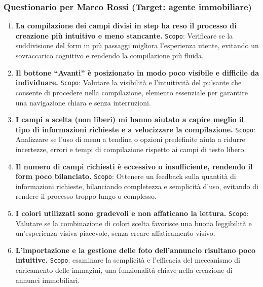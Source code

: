 \subsubsection*{Questionario per Marco Rossi (Target: agente immobiliare)}
\vspace{0.5cm} %
\begin{enumerate}
	\item \textbf{La compilazione dei campi divisi in step ha reso il processo di creazione più intuitivo e meno stancante.}
	\newline
	\texttt{Scopo}: Verificare se la suddivisione del form in più passaggi migliora l’esperienza utente, evitando un sovraccarico cognitivo e rendendo la compilazione più fluida.
	
	\item \textbf{Il bottone “Avanti” è posizionato in modo poco visibile e difficile da individuare.}
	\newline
	\texttt{Scopo}: Valutare la visibilità e l’intuitività del pulsante che consente di procedere nella compilazione, elemento essenziale per garantire una navigazione chiara e senza interruzioni.
	
	\item \textbf{I campi a scelta (non liberi) mi hanno aiutato a capire meglio il tipo di informazioni richieste e a velocizzare la compilazione.}
	\newline
	\texttt{Scopo}: Analizzare se l’uso di menu a tendina o opzioni predefinite aiuta a ridurre incertezze, errori e tempi di compilazione rispetto ai campi di testo libero.
	
	
	\item \textbf{Il numero di campi richiesti è eccessivo o insufficiente, rendendo il form poco bilanciato.}
	\newline
	\texttt{Scopo}: Ottenere un feedback sulla quantità di informazioni richieste, bilanciando completezza e semplicità d’uso, evitando di rendere il processo troppo lungo o complesso.
	
	\item \textbf{I colori utilizzati sono gradevoli e non affaticano la lettura.}
	\newline
	\texttt{Scopo}: Valutare se la combinazione di colori scelta favorisce una buona leggibilità e un’esperienza visiva piacevole, senza creare affaticamento visivo.
	
	\item \textbf{L’importazione e la gestione delle foto dell’annuncio risultano poco intuitive.}
	\newline
	\texttt{Scopo}: esaminare la semplicità e l’efficacia del meccanismo di caricamento delle immagini, una funzionalità chiave nella creazione di annunci immobiliari.
	

\end{enumerate}
